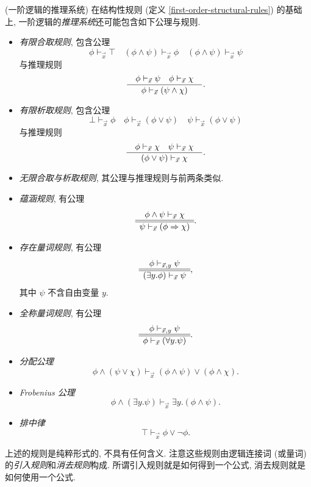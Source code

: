 \begin{definition}
	[label={deduction-system-first-order-logic}]
	{(一阶逻辑的推理系统)}
	在结构性规则 (定义 \ref{first-order-structural-rules}) 的基础上, 一阶逻辑的\emph{推理系统}还可能包含如下公理与规则.
	\begin{itemize}
		\item \emph{有限合取规则}, 包含公理
		$$
		\phi \vdash_{\vec x} \top
		\quad
		(\phi\wedge\psi)\vdash_{\vec x} \phi
		\quad
		(\phi\wedge\psi)\vdash_{\vec x} \psi
		$$
		与推理规则
		$$
		\dfrac{\quad \phi\vdash_{\vec x} \psi\quad \phi\vdash_{\vec x} \chi \quad}{\quad \phi\vdash_{\vec x} (\psi\wedge\chi) \quad}.
		$$
		\item \emph{有限析取规则}, 包含公理
		$$
		\bot \vdash_{\vec x} \phi
		\quad
		\phi \vdash_{\vec x} (\phi\vee\psi)
		\quad
		\psi \vdash_{\vec x} (\phi\vee\psi)
		$$
		与推理规则
		$$
		\dfrac{\quad \phi \vdash_{\vec x} \chi \quad \psi \vdash_{\vec x} \chi \quad}{\quad  (\phi\vee\psi)\vdash_{\vec x}\chi \quad}.
		$$
		\item \emph{无限合取与析取规则}, 其公理与推理规则与前两条类似.
		\item \emph{蕴涵规则}, 有公理
		$$
		\begin{array} {c} \phi\wedge\psi \vdash_{\vec x} \chi \\ \hline \hline \psi\vdash_{\vec x} (\phi\Rightarrow\chi) \end{array}.
		$$
		\item \emph{存在量词规则}, 有公理
		$$
		\begin{array} {c} \phi \vdash_{\vec x,y} \psi \\ \hline \hline (\exists y.\phi)\vdash_{\vec x} \psi \end{array},
		$$
		其中 $\psi$ 不含自由变量 $y$.
		\item \emph{全称量词规则}, 有公理
		$$
		\begin{array} {c} \phi \vdash_{\vec x,y} \psi \\ \hline \hline \phi\vdash_{\vec x} (\forall y.\psi) \end{array}.
		$$
		\item \emph{分配公理}
		$$
		\phi\wedge(\psi\vee\chi)\vdash_{\vec{x}}(\phi\wedge\psi)\vee(\phi\wedge\chi).
		$$
		\item \emph{Frobenius 公理}
		$$
		\phi\land(\exists y.\psi)\vdash_{\vec{x}}\exists y.(\phi\land\psi).
		$$
		\item \emph{排中律}
		$$
		\top\vdash_{\vec{x}}\phi\lor\neg\phi.
		$$
	\end{itemize}
\end{definition}

\begin{remark}
	{}
	上述的规则是纯粹形式的, 不具有任何含义.
	注意这些规则由逻辑连接词 (或量词) 的\emph{引入规则}和\emph{消去规则}构成. 所谓引入规则就是如何得到一个公式, 消去规则就是如何使用一个公式.
\end{remark}


